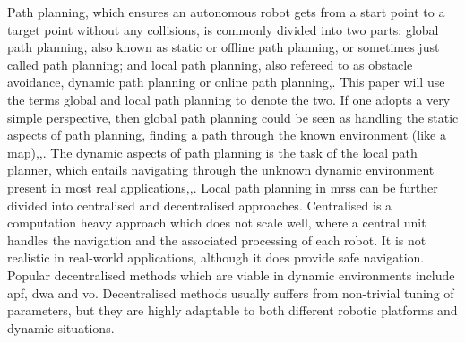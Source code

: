 Path planning, which ensures an autonomous robot gets from a start point to a target point without any collisions, is commonly divided into two parts: global path planning, also known as static or offline path planning, or sometimes just called path planning; and local path planning, also refereed to as obstacle avoidance, dynamic path planning or online path planning\:\cite{cai_mobile_2021},\cite{liu_path_2023}. 
This paper will use the terms global and local path planning to denote the two. 
If one adopts a very simple perspective, then global path planning could be seen as handling the static aspects of path planning, finding a path through the known environment (like a map)\:\cite{cai_mobile_2021},\cite{macenski_desks_2023},\cite{alatise_review_2020}. The dynamic aspects of path planning is the task of the local path planner, which entails navigating through the unknown dynamic environment present in most real applications\:\cite{cai_mobile_2021},\cite{macenski_desks_2023},\cite{alatise_review_2020}.
Local path planning in \acp{mrs} can be further divided into centralised and decentralised approaches\:\cite{vesentini_survey_2024}.
Centralised is a computation heavy approach which does not scale well, where a central unit handles the navigation and the associated processing of each robot\:\cite{vesentini_survey_2024}. It is not realistic in real-world applications, although it does provide safe navigation\:\cite{vesentini_survey_2024}.
Popular decentralised methods which are viable in dynamic environments include \ac{apf}, \ac{dwa} and \ac{vo}\:\cite{vesentini_survey_2024}. Decentralised methods usually suffers from non-trivial tuning of parameters\:\cite{macenski_desks_2023}, but they are highly adaptable to both different robotic platforms and dynamic situations\:\cite{vesentini_survey_2024}.

